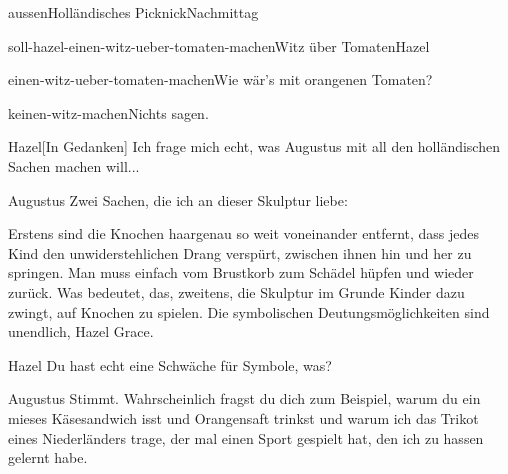 \documentclass[12pt]{article}
\begin{document}
\begin{scene}{aussen}{Holländisches Picknick}{Nachmittag}
\begin{decision}{soll-hazel-einen-witz-ueber-tomaten-machen}{Witz über Tomaten}{Hazel}
\begin{option}{einen-witz-ueber-tomaten-machen}{Wie wär's mit orangenen Tomaten?}
            \end{option}

            \begin{option}{keinen-witz-machen}{Nichts sagen.}
            \end{option}
        \end{decision}


        \begin{dialog}{Hazel}[In Gedanken]
            Ich frage mich echt, was Augustus mit all den holländischen Sachen machen will...
        \end{dialog}


        \begin{dialog}{Augustus}
            Zwei Sachen, die ich an dieser Skulptur liebe:


            Erstens sind die Knochen haargenau so weit voneinander entfernt, dass jedes Kind den unwiderstehlichen Drang verspürt, zwischen ihnen hin und her zu springen.
            Man muss einfach vom Brustkorb zum Schädel hüpfen und wieder zurück.
            Was bedeutet, das, zweitens, die Skulptur im Grunde Kinder dazu zwingt, auf Knochen zu spielen.
            Die symbolischen Deutungsmöglichkeiten sind unendlich, Hazel Grace.
        \end{dialog}

        \begin{dialog}{Hazel}
            Du hast echt eine Schwäche für Symbole, was?
        \end{dialog}

        \begin{dialog}{Augustus}
            Stimmt.
            Wahrscheinlich fragst du dich zum Beispiel, warum du ein mieses Käsesandwich isst und Orangensaft trinkst und warum ich das Trikot eines Niederländers trage, der mal einen Sport gespielt hat, den ich zu hassen gelernt habe.
        \end{dialog}


\end{scene}
\end{document}
